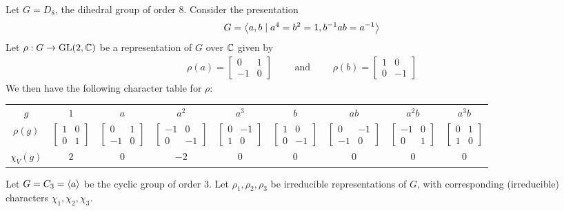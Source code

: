 \begin{example}
    Let $G = D_8$, the dihedral group of order $8$. Consider the presentation
    \begin{align*}
        G = \left\langle a, b \mid a^4 = b^2 = 1, b^{-1} a b = a^{-1} \right\rangle
    \end{align*}
    Let $\rho : G \to \operatorname{GL}\!\left( 2, \mathbb{C} \right)$ be a representation of $G$ over $\mathbb{C}$ given by
    \begin{align*}
        \rho(a) = \begin{bmatrix}
            0 & 1 \\ -1 & 0
        \end{bmatrix}
        \quad\quad \text{ and } \quad\quad
        \rho(b) = \begin{bmatrix}
            1 & 0 \\ 0 & -1
        \end{bmatrix}
    \end{align*}
    We then have the following character table for $\rho$:
    \begin{table}[H]
        \centering
        \begin{tabular}{|c|cccccccc|}
            \hline
            $g$ & $1$ & $a$ & $a^2$ & $a^3$ & $b$ & $ab$ & $a^2 b$ & $a^3 b$ \\
            $\rho(g)$ &
            $\begin{bmatrix} 1 & 0 \\ 0 & 1 \end{bmatrix}$
            &
            $\begin{bmatrix} 0 & 1 \\ -1 & 0 \end{bmatrix}$
            &
            $\begin{bmatrix} -1 & 0 \\ 0 & -1 \end{bmatrix}$
            &
            $\begin{bmatrix} 0 & -1 \\ 1 & 0 \end{bmatrix}$
            &
            $\begin{bmatrix} 1 & 0 \\ 0 & -1 \end{bmatrix}$
            &
            $\begin{bmatrix} 0 & -1 \\ -1 & 0 \end{bmatrix}$
            &
            $\begin{bmatrix} -1 & 0 \\ 0 & 1 \end{bmatrix}$
            &
            $\begin{bmatrix} 0 & 1 \\ 1 & 0 \end{bmatrix}$
            \\
            $\chi_V(g)$ & $2$ & $0$ & $-2$ & $0$ & $0$ & $0$ & $0$ & $0$ \\
            \hline
        \end{tabular}
    \end{table}
\end{example}

\begin{example}
    Let $G = C_3 = \left\langle a \right\rangle$ be the cyclic group of order $3$. Let $\rho_1, \rho_2, \rho_3$ be irreducible representations of $G$, with corresponding (irreducible) characters $\chi_1, \chi_2, \chi_3$.
\end{example}
